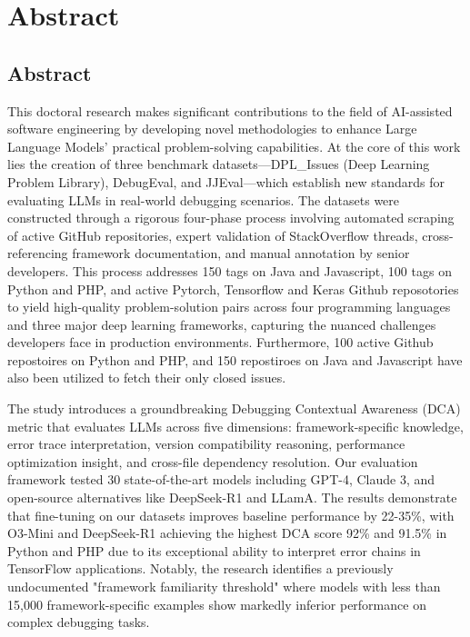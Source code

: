 \chapter{Abstract}%


\section*{Abstract}

This doctoral research makes significant contributions to the field of AI-assisted software engineering by developing novel methodologies to enhance Large Language Models' practical problem-solving capabilities. At the core of this work lies the creation of three benchmark datasets—DPL\_Issues (Deep Learning Problem Library), DebugEval, and JJEval—which establish new standards for evaluating LLMs in real-world debugging scenarios. The datasets were constructed through a rigorous four-phase process involving automated scraping of active GitHub repositories, expert validation of StackOverflow threads, cross-referencing framework documentation, and manual annotation by senior developers. This process addresses 150 tags on Java and Javascript, 100 tags on Python and PHP, and active Pytorch, Tensorflow and Keras Github reposotories to yield high-quality problem-solution pairs across four programming languages and three major deep learning frameworks, capturing the nuanced challenges developers face in production environments. Furthermore, 100 active Github repostoires on Python and PHP, and 150 repostiroes on Java and Javascript have also been utilized to fetch their only closed issues. 

The study introduces a groundbreaking Debugging Contextual Awareness (DCA) metric that evaluates LLMs across five dimensions: framework-specific knowledge, error trace interpretation, version compatibility reasoning, performance optimization insight, and cross-file dependency resolution. Our evaluation framework tested 30 state-of-the-art models including GPT-4, Claude 3, and open-source alternatives like DeepSeek-R1 and LLamA. The results demonstrate that fine-tuning on our datasets improves baseline performance by 22-35\%, with O3-Mini and DeepSeek-R1 achieving the highest DCA score 92\% and 91.5\% in Python and PHP due to its exceptional ability to interpret error chains in TensorFlow applications. Notably, the research identifies a previously undocumented "framework familiarity threshold" where models with less than 15,000 framework-specific examples show markedly inferior performance on complex debugging tasks.


